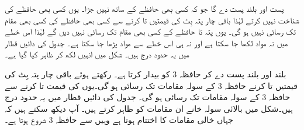پست  اور بلند  پست  دے گا جو کہ کسی بھی حافظے کے ساتھ نہیں جڑا۔ یوں  کسی بھی حافظے کی شناخت نہیں کرتے لہٰذا باقی چار پتہ بِٹ کی قیمتیں  تا  کرنے سے کسی بھی حافظے کی کسی بھی مقام تک رسائی نہیں ہو گی۔ یوں پتہ  تا  حافظے کے کسی بھی مقام تک رسائی نہیں دیں گے لہٰذا اس خطے میں نہ مواد لکھا جا سکتا ہے اور نہ ہی اس خطے سے مواد پڑھا جا سکتا ہے۔ جدول کی دائیں قطار میں یہ حدود درج ہیں۔ شکل   میں انہیں  لکھ کر ظاہر کیا گیا ہے۔

بلند  اور بلند  پست  دے کر حافظہ 3 کو بیدار کرتا ہے۔  رکھتے ہوئے باقی چار پتہ بِٹ کی قیمتیں  تا  کرنے حافظہ 3 کے سولہ مقامات تک رسائی ہو گی۔یوں  کی قیمت  تا  کرنے سے حافظہ 3 کے سولہ مقامات تک رسائی ہو گی۔ جدول کی دائیں قطار میں یہ حدود درج ہیں۔شکل   میں بالائی سولہ خانے ان مقامات کو ظاہر کرتے ہیں۔  آپ دیکھ سکتے ہیں کہ جہاں خالی مقامات کا اختتام ہوتا ہے وہیں سے حافظہ 3 شروع ہوتا ہے۔

